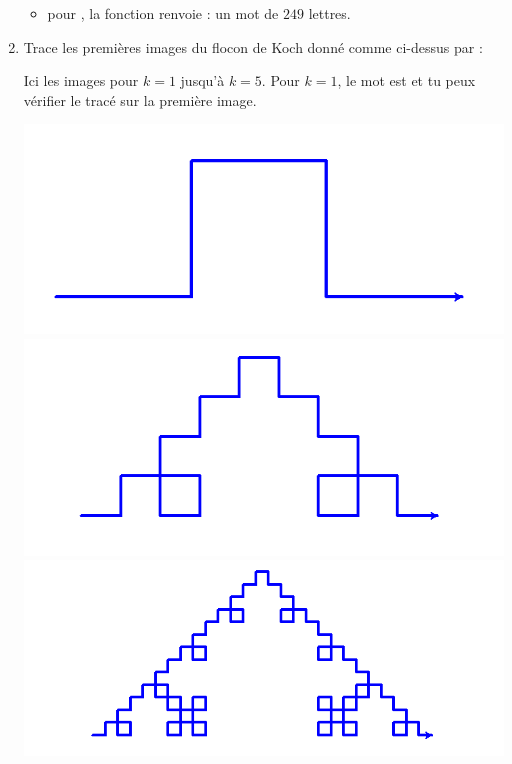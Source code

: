 \documentclass[11pt,class=report,crop=false]{standalone}
\begin{document}
\begin{activite}
\begin{enumerate}
\begin{itemize}
    \item pour , la fonction renvoie :  un mot de $249$ lettres.
    
  \end{itemize}
  
  \item Trace les premières images du  flocon de Koch donné comme ci-dessus par :  
  
  
  Ici les images pour $k=1$ jusqu'à $k=5$.
  Pour $k=1$, le mot est  et tu peux vérifier le tracé sur la première image.
  
\begin{center}
\includegraphics[scale=\myscale,scale=0.22]{ecran-lsysteme-3a}
\includegraphics[scale=\myscale,scale=0.22]{ecran-lsysteme-3b}
\includegraphics[scale=\myscale,scale=0.22]{ecran-lsysteme-3c}

\end{center}
\end{enumerate}
\end{activite}
\end{document}
